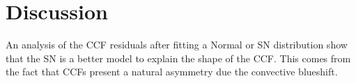 \documentclass[11pt, oneside]{article}
\begin{document}


\section{Discussion} \label{sec:discu}

An analysis of the CCF residuals after fitting a Normal or SN distribution show that the SN is a better model to explain the shape of the CCF. This comes from the fact that CCFs present a natural asymmetry due the convective blueshift.
\end{document}
